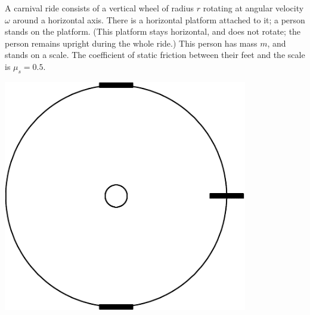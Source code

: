 \documentclass[12pt]{article}
\begin{document}
\begin{enumerate}
\begin{minipage}[t]{0.6\textwidth}
\item 

A carnival ride consists of a vertical wheel of radius $r$ rotating at angular velocity $\omega$ around a
horizontal axis. There is a horizontal platform attached to it; a person stands on the platform. (This platform
stays horizontal, and does not rotate; the person remains upright during the whole ride.) This
person has mass $m$, and stands on a scale. The coefficient of static friction between their feet and the scale is 
$\mu_s = 0.5$.
\end{minipage}
\begin{minipage}{0.35\textwidth}
\vspace{0.8in}
\begin{center}
\includegraphics[width=0.8\textwidth]{wheel-crop.pdf}
\end{center}
\end{minipage}


\end{enumerate}
\end{document}
